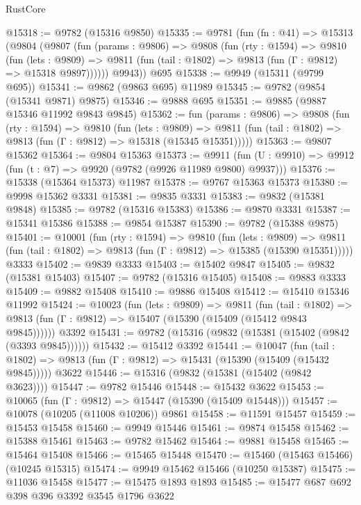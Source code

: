 \begin{lexlean}{RustCore}
\begin{coremodule}
@15318 := @9782 (@15316 @9850)
@15335 := @9781
    (fun (fn : @41) =>
    @15313
      (@9804
        (@9807
          (fun (params : @9806) =>
          @9808
            (fun (rty : @1594) =>
            @9810
              (fun (lets : @9809) =>
              @9811 (fun (tail : @1802) => @9813 (fun (Γ : @9812) => @15318 @9897))))))
        @9943))
    @695
@15338 := @9949 (@15311 (@9799 @695))
@15341 := @9862 (@9863 @695) @11989
@15345 := @9782 (@9854 (@15341 @9871) @9875)
@15346 := @9888 @695
@15351 := @9885 (@9887 @15346 @11992 @9843 @9845)
@15362 := fun (params : @9806) =>
  @9808
    (fun (rty : @1594) =>
    @9810
      (fun (lets : @9809) =>
      @9811 (fun (tail : @1802) => @9813 (fun (Γ : @9812) => @15318 (@15345 @15351)))))
@15363 := @9807 @15362
@15364 := @9804 @15363
@15373 := @9911
    (fun (U : @9910) => @9912 (fun (t : @7) => @9920 (@9782 (@9926 @11989 @9800) @9937)))
@15376 := @15338 (@15364 @15373) @11987
@15378 := @9767 @15363 @15373
@15380 := @9998 @15362 @3331
@15381 := @9835 @3331
@15383 := @9832 (@15381 @9848)
@15385 := @9782 (@15316 @15383)
@15386 := @9870 @3331
@15387 := @15341 @15386
@15388 := @9854 @15387
@15390 := @9782 (@15388 @9875)
@15401 := @10001
    (fun (rty : @1594) =>
    @9810
      (fun (lets : @9809) =>
      @9811 (fun (tail : @1802) => @9813 (fun (Γ : @9812) => @15385 (@15390 @15351)))))
    @3333
@15402 := @9839 @3333
@15403 := @15402 @9847
@15405 := @9832 (@15381 @15403)
@15407 := @9782 (@15316 @15405)
@15408 := @9883 @3333
@15409 := @9882 @15408
@15410 := @9886 @15408
@15412 := @15410 @15346 @11992
@15424 := @10023
    (fun (lets : @9809) =>
    @9811
      (fun (tail : @1802) =>
      @9813 (fun (Γ : @9812) => @15407 (@15390 (@15409 (@15412 @9843 @9845))))))
    @3392
@15431 := @9782 (@15316 (@9832 (@15381 (@15402 (@9842 (@3393 @9845))))))
@15432 := @15412 @3392
@15441 := @10047
    (fun (tail : @1802) => @9813 (fun (Γ : @9812) => @15431 (@15390 (@15409 (@15432 @9845)))))
    @3622
@15446 := @15316 (@9832 (@15381 (@15402 (@9842 @3623))))
@15447 := @9782 @15446
@15448 := @15432 @3622
@15453 := @10065 (fun (Γ : @9812) => @15447 (@15390 (@15409 @15448)))
@15457 := @10078 (@10205 (@11008 @10206)) @9861
@15458 := @11591 @15457
@15459 := @15453 @15458
@15460 := @9949 @15446
@15461 := @9874 @15458
@15462 := @15388 @15461
@15463 := @9782 @15462
@15464 := @9881 @15458
@15465 := @15464 @15408
@15466 := @15465 @15448
@15470 := @15460 (@15463 @15466) (@10245 @15315)
@15474 := @9949 @15462 @15466 (@10250 @15387)
@15475 := @11036 @15458
@15477 := @15475 @1893 @1893
@15485 := @15477 @687 @692 @398 @396 @3392 @3545 @1796 @3622

\end{coremodule}
\end{lexlean}
